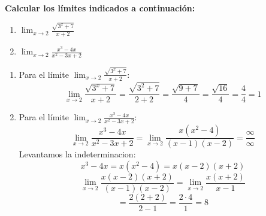 \documentclass[answers]{exam}
\begin{document}
\begin{questions}
\vspace{0.5cm}

\question \large\textbf{Calcular los límites indicados a continuación:}
\begin{enumerate}[label=\alph*.]
    \item $\displaystyle \lim_{x\to{2}} \frac{\sqrt{3^x+7}}{x+2}$
    \item $\displaystyle \lim_{x\to{2}} \frac{x^3-4x}{x^2-3x+2}$
\end{enumerate}
\vspace{0.5cm}
\begin{solution}
\begin{enumerate}[label=\alph*.]
    \item Para el límite $\displaystyle \lim_{x\to{2}} \frac{\sqrt{3^x+7}}{x+2}$:
    \[
    \lim_{x \to 2} \frac{\sqrt{3^x+7}}{x+2} = \frac{\sqrt{3^2+7}}{2+2} = \frac{\sqrt{9+7}}{4} = \frac{\sqrt{16}}{4} = \frac{4}{4} = 1
    \]

    \item Para el límite $\displaystyle \lim_{x\to{2}} \frac{x^3-4x}{x^2-3x+2}$:
    \[
    \lim_{x \to 2} \frac{x^3-4x}{x^2-3x+2} = \lim_{x \to 2} \frac{x(x^2-4)}{(x-1)(x-2)}= \frac{\infty}{\infty}
    \]
    Levantamos la indeterminacion:
    \[
    x^3-4x = x(x^2-4) = x(x-2)(x+2)
    \]
    \[
    \lim_{x \to 2} \frac{x(x-2)(x+2)}{(x-1)(x-2)} = \lim_{x \to 2} \frac{x(x+2)}{x-1}
    \]
    \vspace{0.1cm}
    \[
    = \frac{2(2+2)}{2-1} = \frac{2 \cdot 4}{1} = 8
    \]
\end{enumerate}
\end{solution}

\vspace{0.5cm}

\end{questions}
\end{document}

